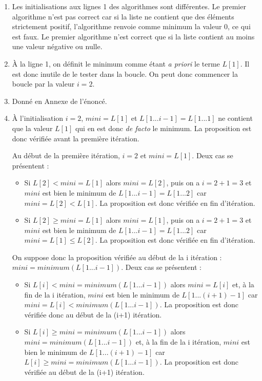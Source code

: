\begin{enumerate}

\item Les initialisations aux lignes 1 des algorithmes sont différentes. Le premier algorithme n'est pas correct car si la liste ne contient que des éléments strictement positif, l'algorithme renvoie comme minimum la valeur 0, ce qui est faux. Le premier algorithme n'est correct que si la liste contient au moins une valeur négative ou nulle.

\item À la ligne 1, on définit le minimum comme étant \textit{a priori} le terme $L[1]$. Il est donc inutile de le tester dans la boucle. On peut donc commencer la boucle par la valeur $i=2$. 

\item Donné en Annexe de l'énoncé.

\item À l'initialisation $i=2$, $mini=L[1]$ et $L[1...i-1]=L[1...1]$ ne contient que la valeur $L[1]$ qui en est donc \textit{de facto} le minimum. La proposition est donc vérifiée avant la première itération.

Au début de la première itération, $i=2$ et $mini=L[1]$. Deux cas se présentent :
\begin{itemize}
\item Si $L[2]<mini=L[1]$ alors $mini=L[2]$, puis on a $i=2+1=3$ et $mini$ est bien le minimum de $L[1...i-1]=L[1...2]$ car $mini=L[2] < L[1]$. La proposition est donc vérifiée en fin d'itération.
\item Si $L[2] \geq mini=L[1]$ alors $mini=L[1]$, puis on a $i=2+1=3$ et $mini$ est bien le minimum de $L[1...i-1]=L[1...2]$ car $mini = L[1] \leq L[2]$. La proposition est donc vérifiée en fin d'itération.
\end{itemize}

On suppose donc la proposition vérifiée au début de la i itération : $mini = minimum(L[1...i-1])$. Deux cas se présentent :
\begin{itemize}
\item Si $L[i]<mini=minimum(L[1...i-1])$ alors $mini=L[i]$ et, à la fin de la i itération, $mini$ est bien le minimum de $L[1...(i+1)-1]$ car $mini=L[i]<minimum(L[1...i-1])$. La proposition est donc vérifiée donc au début de la (i+1) itération.
\item Si $L[i]\geq mini=minimum(L[1...i-1])$ alors $mini=minimum(L[1...i-1])$ et, à la fin de la i itération, $mini$ est bien le minimum de $L[1...(i+1)-1]$ car $L[i]\geq mini=minimum(L[1...i-1])$. La proposition est donc vérifiée au début de la (i+1) itération.
\end{itemize}


\end{enumerate}
